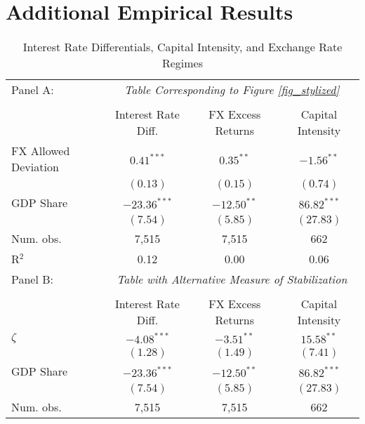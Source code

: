 \section{Additional Empirical Results \label{Appendix_Empirics}}

\begin{table}[htp!]
  \caption{Interest Rate Differentials, Capital Intensity, and
    Exchange Rate Regimes \vspace{-1em}}
  \label{table:stylized}
  \begin{center}
    \begin{tabular}{l c c c }
      \hline
      \hline
      Panel A: & \multicolumn{3}{c}{\emph{Table Corresponding to Figure \ref{fig_stylized}}} \\
      \cline{2 - 4} \vspace{-1em} \\
               & Interest Rate Diff. & FX Excess Returns & Capital Intensity \\
      \hline
      FX Allowed Deviation            & $0.41^{***}$   & $0.35^{**}$   & $-1.56^{**}$     \\
               & $(0.13)$       & $(0.15)$      & $(0.74)$       \\
      GDP Share & $-23.36^{***}$ & $-12.50^{**}$ & $86.82^{***}$ \\
               & $(7.54)$       & $(5.85)$      & $(27.83)$       \\
      \hline
      Num. obs.               & 7,515           & 7,515          & 662            \\
      R$^2$       & 0.12           & 0.00          & 0.06           \\
      \hline
      Panel B: & \multicolumn{3}{c}{\emph{Table with Alternative Measure of Stabilization}} \\
      \cline{2 - 4} \vspace{-1em} \\
               & Interest Rate Diff. & FX Excess Returns & Capital Intensity \\
      \hline
      $\zeta$ & $-4.08^{***}$  & $-3.51^{**}$  & $15.58^{**}$    \\
               & $(1.28)$       & $(1.49)$      & $(7.41)$       \\
      GDP Share & $-23.36^{***}$ & $-12.50^{**}$ & $86.82^{***}$ \\
               & $(7.54)$       & $(5.85)$      & $(27.83)$       \\
      \hline
      Num. obs.               & 7,515           & 7,515          & 662            \\

\end{tabular}
\end{center}
\end{table}
